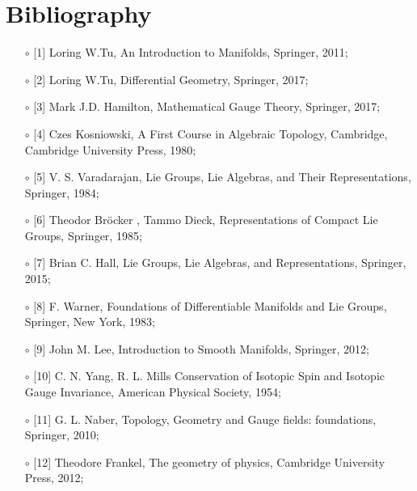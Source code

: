 \documentclass[12pt,a4paper]{report}
\theoremstyle{definition}
\theoremstyle{Theorem}
\theoremstyle{definition}
\theoremstyle{definition}
\begin{document}
\begin{comment}
			Furthermore, note that the curvature $F$, for $k=-1$, coincides with the volume form $\omega=\sqrt{|\det(g)|}d\alpha\wedge d\beta$. Moreover, by setting  $k=-g$ we get:
			$$s^*A=-g\cos(\alpha)d\beta$$
			This is clearly gauge equivalent to the \textit{Dirac monopole} on the northern patch $U_N$, defined as:
			$$A_{+}=g(1-\cos(\alpha))d\beta$$
			The corresponding potential on the southern patch $U_S$ is obtained by shifting $\alpha\rightarrow \pi-\alpha$ and $\beta\rightarrow 2\pi-\beta$:
			$$A_{-}=g(-1-\cos(\alpha))d\beta$$
			One can then calculate the total magnetic charge with Gauss'theorem. Let $H^{\pm}$ be the two hemispheres of $S^2$, then:
			$$Q_m=\int_{S^2} F=\int_{H^+} dA_++\int_{H^-} dA_-$$
			By Stokes'theorem \ref{Stokes}, we get:
			$$Q_m=\int_{\partial H^+}dA_+-\int_{\partial H^-}dA_-=\int_{S^1} 2g=4\pi g$$
			We clearly see that we have a non 0 magnetic charge. This is a consequence of the non triviality of the Hopf bundle, i.e, there is no globally defined potential on the Hopf bundle. Even though, from \ref{Prop_7.2.2}, the pullback of the curvature form $F$ is independent from the choice of the section $s$, the gauge potential $A$ isn't, due to the non existence of a global section.
		\end{Obs}
	\end{comment}
	\chapter*{Bibliography}
	\begin{itemize}
		\item[$\circ$] [1] Loring W.Tu, An Introduction to Manifolds, Springer, 2011;
		\item[$\circ$] [2] Loring W.Tu, Differential Geometry, Springer, 2017;
		\item[$\circ$] [3] Mark J.D. Hamilton, Mathematical Gauge Theory, Springer, 2017;
		\item[$\circ$] [4] Czes Kosniowski, A First Course in Algebraic Topology, Cambridge, Cambridge University Press, 1980;
		\item[$\circ$] [5] V. S. Varadarajan, Lie Groups, Lie Algebras, and Their Representations, Springer, 1984;
		\item[$\circ$] [6] Theodor Bröcker , Tammo Dieck, Representations of Compact Lie Groups, Springer, 1985;
		\item[$\circ$] [7] Brian C. Hall, Lie Groups, Lie Algebras, and Representations, Springer, 2015;
		\item[$\circ$] [8] F. Warner, Foundations of Differentiable Manifolds and Lie Groups, Springer, New York, 1983;
		\item[$\circ$] [9] John M. Lee, Introduction to Smooth Manifolds, Springer, 2012;
		\item[$\circ$] [10] C. N. Yang, R. L. Mills Conservation of Isotopic Spin and Isotopic Gauge Invariance, American Physical Society, 1954;
		\item[$\circ$] [11] G. L. Naber,
		Topology, Geometry and Gauge fields: foundations, Springer, 2010;
		\item[$\circ$] [12] Theodore Frankel, The geometry of physics, 
		Cambridge University Press, 2012;
	\end{itemize}
	
\end{document}
